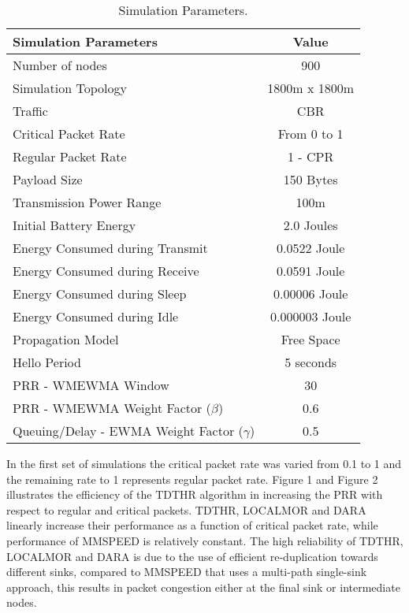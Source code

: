\documentclass[fleqn,twoside]{article}
\begin{document}
\begin{table}[ht]
\centering
\caption{Simulation Parameters.}
\begin{tiny}
\begin{tabular}{|l|c| } \hline
{\bf Simulation Parameters} & {\bf  Value} \\ \hline
{Number of nodes} 		&{900} \\ \hline
{Simulation Topology} 		&{1800m x 1800m} \\ \hline
{Traffic} 			&{CBR} \\ \hline
{Critical Packet Rate} 		&{From 0 to 1} \\ \hline
{Regular Packet Rate} 		&{1 - CPR} \\ \hline
{Payload Size} 			&{150 Bytes} \\ \hline
{Transmission Power Range}			&{100m} \\ \hline
{Initial Battery Energy }		&{2.0 Joules} \\ \hline
{Energy Consumed during Transmit }	&{0.0522 Joule} \\ \hline
{Energy Consumed during Receive }	&{0.0591 Joule} \\ \hline
{Energy Consumed during Sleep }		&{0.00006 Joule} \\ \hline
{Energy Consumed during Idle }		&{0.000003 Joule} \\ \hline
{Propagation Model}		&{Free Space} \\ \hline
{Hello Period} 			&{5 seconds} \\ \hline
{PRR - WMEWMA Window} 			&{30} \\ \hline
{PRR - WMEWMA Weight Factor ($\beta$)}	&{0.6} \\ \hline
{Queuing/Delay - EWMA Weight Factor ($\gamma$)}	&{0.5} \\ \hline
\end{tabular}
\end{tiny}
\end{table}

In the first set of simulations the critical packet rate was varied from 0.1 to 1 and the remaining rate to 1 represents 
regular packet rate. Figure 1 and Figure 2 illustrates the efficiency of the TDTHR algorithm in increasing the PRR with respect
to regular and critical packets.
TDTHR, LOCALMOR and DARA linearly increase their performance as a function
of critical packet rate, while performance of MMSPEED is relatively constant. 
The high reliability of TDTHR, LOCALMOR and DARA is due to the use of efficient re-duplication towards different sinks, compared to MMSPEED that uses a multi-path single-sink approach, this results in packet congestion either at the final
sink or intermediate nodes. 
\end{document}
